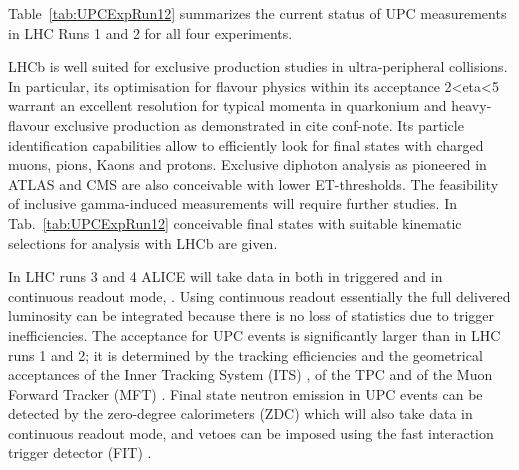 \documentclass[../report.tex]{subfiles}
\begin{document}
Table~\ref{tab:UPCExpRun12} summarizes the current status of UPC
measurements in LHC Runs 1 and 2 for all four experiments.

LHCb is well suited for exclusive production studies in ultra-peripheral collisions. In particular, its optimisation for flavour physics within its acceptance 2<eta<5 warrant an excellent resolution for typical momenta in quarkonium and heavy-flavour exclusive production as demonstrated in cite conf-note. Its particle identification capabilities allow to efficiently look for final states with charged muons, pions, Kaons and protons. Exclusive diphoton analysis as pioneered in ATLAS and CMS are also conceivable with lower ET-thresholds. The feasibility of inclusive gamma-induced measurements will require further studies. In Tab.~\ref{tab:UPCExpRun12} conceivable final states with suitable kinematic selections for analysis with LHCb are given.

In LHC runs 3 and 4 ALICE \cite{Abelevetal:2014cna} will take data in
both in triggered and in continuous readout mode,
\cite{Buncic:2015ari}. Using continuous
readout \cite{Antoniolietal:2013} essentially the full delivered luminosity can be integrated
because there is no loss of statistics due to trigger
inefficiencies. The acceptance for UPC events is significantly larger
than in LHC runs 1 and 2; it is determined by the tracking
efficiencies and the geometrical acceptances of the Inner Tracking
System (ITS) \cite{Abelevetal:2014dna}, of the TPC
\cite{ALICE:2014qrd} and of the Muon Forward Tracker (MFT) \cite{Uras:2012af}. Final
state neutron emission in UPC events can be detected by the
zero-degree calorimeters (ZDC) which will also take data in continuous
readout mode, and vetoes can be imposed using the fast interaction
trigger detector (FIT)
.
\end{document}
